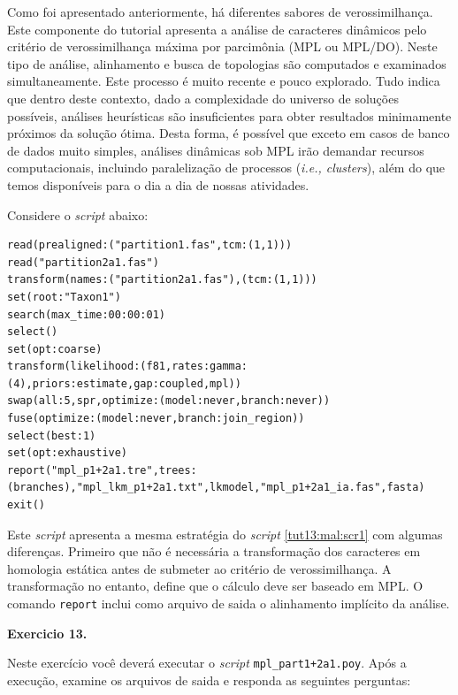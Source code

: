 \begin{refsection}
Como foi apresentado anteriormente, há diferentes sabores de verossimilhança. Este componente do tutorial apresenta a análise de caracteres dinâmicos pelo critério de verossimilhança máxima por parcimônia (MPL ou MPL/DO). Neste tipo de análise, alinhamento e busca de topologias são computados e examinados simultaneamente. Este processo é muito recente e pouco explorado. Tudo indica que dentro deste contexto, dado a complexidade do universo de soluções possíveis, análises heurísticas são insuficientes para obter resultados minimamente próximos da solução ótima. Desta forma, é possível que exceto em casos de banco de dados muito simples, análises dinâmicas sob MPL irão demandar recursos computacionais, incluindo paralelização de processos (\textit{i.e., clusters}), além do que temos disponíveis para o dia a dia de nossas atividades.

	Considere o \textit{script} abaixo:

\scriptsize
\begin{lstlisting}[caption= conteúdo do arquivo mpl\_part1+2a1.poy.,label=tut13:mpl:scr1]
read(prealigned:("partition1.fas",tcm:(1,1)))
read("partition2a1.fas")
transform(names:("partition2a1.fas"),(tcm:(1,1)))
set(root:"Taxon1")
search(max_time:00:00:01)
select()
set(opt:coarse)
transform(likelihood:(f81,rates:gamma:(4),priors:estimate,gap:coupled,mpl))
swap(all:5,spr,optimize:(model:never,branch:never))
fuse(optimize:(model:never,branch:join_region))
select(best:1)
set(opt:exhaustive)
report("mpl_p1+2a1.tre",trees:(branches),"mpl_lkm_p1+2a1.txt",lkmodel,"mpl_p1+2a1_ia.fas",fasta)
exit()
\end{lstlisting}
\normalsize

Este \textit{script} apresenta a mesma estratégia do \textit{script} \ref{tut13:mal:scr1} com algumas diferenças. Primeiro que não é necessária a transformação dos caracteres em homologia estática antes de submeter ao critério de verossimilhança. A transformação no entanto, define que o cálculo deve ser baseado em MPL. O comando \texttt{report} inclui como arquivo de saida o alinhamento implícito da análise.\\


\begin{blackBlock}{\textbf{Exercicio 13.}}\label{tut13:ex:13.7}

Neste exercício você deverá executar o \textit{script} \texttt{mpl\_part1+2a1.poy}. Após a execução, examine os arquivos de saida e responda as seguintes perguntas:

\end{blackBlock}



\end{refsection}
